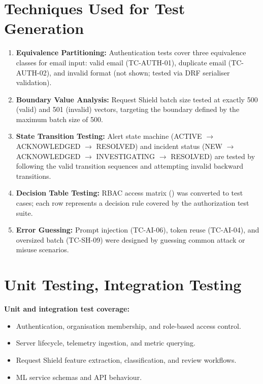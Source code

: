 \section{Techniques Used for Test Generation}

\begin{enumerate}
  \item \textbf{Equivalence Partitioning:} Authentication tests cover three
        equivalence classes for email input: valid email (TC-AUTH-01),
        duplicate email (TC-AUTH-02), and invalid format (not shown; tested
        via DRF serialiser validation).

  \item \textbf{Boundary Value Analysis:} Request Shield batch size tested at
        exactly 500 (valid) and 501 (invalid) vectors, targeting the boundary
        defined by the maximum batch size of 500.

  \item \textbf{State Transition Testing:} Alert state machine (ACTIVE $\to$
        ACKNOWLEDGED $\to$ RESOLVED) and incident status (NEW $\to$
        ACKNOWLEDGED $\to$ INVESTIGATING $\to$ RESOLVED) are tested by
        following the valid transition sequences and attempting invalid
        backward transitions.

  \item \textbf{Decision Table Testing:} RBAC access matrix ()
        was converted to test cases; each row represents a decision rule
        covered by the authorization test suite.

  \item \textbf{Error Guessing:} Prompt injection (TC-AI-06), token reuse
        (TC-AI-04), and oversized batch (TC-SH-09) were designed by guessing
        common attack or misuse scenarios.
\end{enumerate}

\section{Unit Testing, Integration Testing}

\textbf{Unit and integration test coverage:}
\begin{itemize}
  \item Authentication, organisation membership, and role-based access control.
  \item Server lifecycle, telemetry ingestion, and metric querying.
  \item Request Shield feature extraction, classification, and review workflows.
  \item ML service schemas and API behaviour.
\end{itemize}

